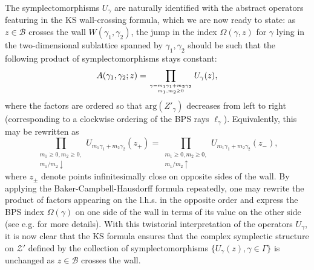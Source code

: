 \documentclass[12pt,reqno]{article}
\numberwithin{equation}{section}
\newcommand{\be}{\begin{equation}}
\newcommand{\ee}{\end{equation}}
\newcommand{\cB}{\mathcal{B}}
\newcommand{\cZ}{\mathcal{Z}}
\newcommand{\stg}{{U}_\gamma}
\def\pcZ{\cZ'}
\numberwithin{equation}{section}
\begin{document}
The symplectomorphisms $\stg$ are naturally identified with the abstract operators
featuring in the KS wall-crossing formula, which we are now ready to state: as $z\in \cB$
crosses the wall $W(\gamma_1, \gamma_2)$, the jump in the index $\Omega(\gamma,z)$
for $\gamma$ lying in the two-dimensional sublattice spanned by $\gamma_1, \gamma_2$
should be such that the following product of symplectomorphisms stays constant:
\be
A(\gamma_1, \gamma_2; z)=
\prod_{\gamma=m_1\gamma_1+m_2\gamma_2\atop m_1, m_2\geq 0} \stg(z),
\ee
where the factors are ordered so that $\text{arg}(Z'_\gamma)$ decreases from left to right
(corresponding to a clockwise ordering of the BPS rays $\ell_\gamma$).
Equivalently, this may be rewritten as
\be
\label{ewall}
\prod_{\substack{m_1\geq 0,m_2\geq 0, \\ m_1/m_2\downarrow}}
U_{m_1\gamma_1+m_2\gamma_2}(z_+)
=
\prod_{\substack{m_1\geq 0,m_2\geq 0, \\ m_1/m_2\uparrow}}
U_{m_1\gamma_1+m_2\gamma_2}(z_-),
\ee
where $z_{\pm}$ denote points infinitesimally close on opposite sides of the wall.
By applying the Baker-Campbell-Hausdorff formula repeatedly, one may rewrite
the product of factors appearing on the l.h.s. in the opposite order and express
the BPS index $\Omega(\gamma)$ on one side of the wall in terms of its
value on the other side (see e.g. \cite{Pioline:2011gf} for more details).
With this twistorial interpretation of the operators $\stg$, it is now clear
that the KS formula ensures
that the complex symplectic structure on $\pcZ$ defined by the
collection of symplectomorphisms $\{\stg(z), \gamma\in\Gamma\}$ is unchanged as
$z\in\cB$ crosses the wall.
\end{document}
